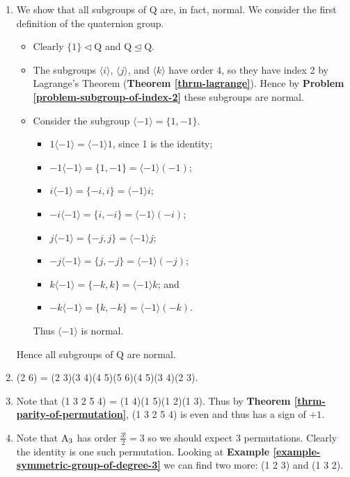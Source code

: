 \begin{enumerate}
    \item We show that all subgroups of $\mathrm{Q}$ are, in fact, normal. We consider the first definition of the quaternion group.
    \begin{itemize}
        \item Clearly $\{1\} \lhd \mathrm{Q}$ and $\mathrm{Q} \unlhd \mathrm{Q}$.
        \item The subgroups $\langle i\rangle$, $\langle j\rangle$, and $\langle k\rangle$ have order 4, so they have index 2 by Lagrange's Theorem (\textbf{Theorem \ref{thrm-lagrange}}). Hence by \textbf{Problem \ref{problem-subgroup-of-index-2}} these subgroups are normal.
        \item Consider the subgroup $\langle -1 \rangle = \{1, -1\}$. \begin{itemize}
            \item $1\langle -1 \rangle = \langle -1 \rangle1$, since 1 is the identity;
            \item $-1\langle -1 \rangle = \{1, -1\} = \langle -1 \rangle(-1)$;
            \item $i\langle -1 \rangle = \{-i, i\} = \langle -1 \rangle i$;
            \item $-i\langle -1 \rangle = \{i, -i\} = \langle -1 \rangle (-i)$;
            \item $j\langle -1 \rangle = \{-j, j\} = \langle -1 \rangle j$;
            \item $-j\langle -1 \rangle = \{j, -j\} = \langle -1 \rangle (-j)$;
            \item $k\langle -1 \rangle = \{-k, k\} = \langle -1 \rangle k$; and
            \item $-k\langle -1 \rangle = \{k, -k\} = \langle -1 \rangle (-k)$.
        \end{itemize}
        Thus $\langle -1 \rangle$ is normal.
    \end{itemize}
    Hence all subgroups of $\mathrm{Q}$ are normal.

    \item (2 6) = (2 3)(3 4)(4 5)(5 6)(4 5)(3 4)(2 3).

    \item Note that (1 3 2 5 4) = (1 4)(1 5)(1 2)(1 3). Thus by \textbf{Theorem \ref{thrm-parity-of-permutation}}, (1 3 2 5 4) is even and thus has a sign of $+1$.

    \item Note that $\mathrm{A}_{3}$ has order $\frac{3!}{2} = 3$ so we should expect 3 permutations. Clearly the identity is one such permutation. Looking at \textbf{Example \ref{example-symmetric-group-of-degree-3}} we can find two more: (1 2 3) and (1 3 2).


\end{enumerate}
